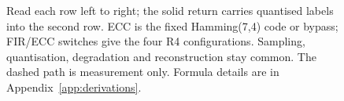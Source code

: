 \begin{figure}[htbp]
\caption{Read each row left to right; the solid return carries quantised
labels into the second row. ECC is the fixed Hamming(7,4) code or bypass;
FIR/ECC switches give the four R4 configurations. Sampling, quantisation,
degradation and reconstruction stay common. The dashed path is measurement
only. Formula details are in Appendix~\ref{app:derivations}.}
\label{fig:system-flow}
\end{figure}

\FloatBarrier
